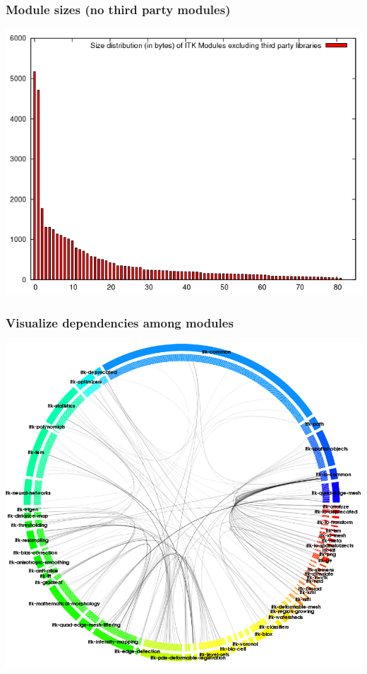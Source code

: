 \begin{frame}
\frametitle{Module sizes (no third party modules)}
\center
\begin{center}
\includegraphics[height=0.8\textheight]{../Art/moduleSizePlotNoThirdParty.png}
\end{center}
\end{frame}

\begin{frame}
\frametitle{Visualize dependencies among modules}
\center
\begin{center}
\includegraphics[height=0.8\textheight]{../Art/moduleDependency.png}
\end{center}
\end{frame}

